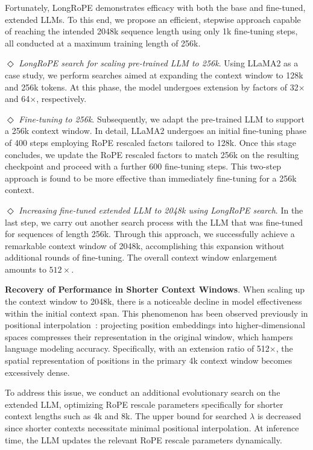 Fortunately, LongRoPE demonstrates efficacy with both the base and fine-tuned, extended LLMs. To this end, we propose an efficient, stepwise approach capable of reaching the intended 2048k sequence length using only 1k fine-tuning steps, all conducted at a maximum training length of 256k.

$\Diamond$ \textit{LongRoPE search for scaling pre-trained LLM to 256k}. Using LLaMA2 as a case study, we perform searches aimed at expanding the context window to 128k and 256k tokens. At this phase, the model undergoes extension by factors of 32$\times$ and 64$\times$, respectively.

$\Diamond$ \textit{Fine-tuning to 256k}. Subsequently, we adapt the pre-trained LLM to support a 256k context window. In detail, LLaMA2 undergoes an initial fine-tuning phase of 400 steps employing RoPE rescaled factors tailored to 128k. Once this stage concludes, we update the RoPE rescaled factors to match 256k on the resulting checkpoint and proceed with a further 600 fine-tuning steps. This two-step approach is found to be more effective than immediately fine-tuning for a 256k context.

$\Diamond$ \textit{Increasing fine-tuned extended LLM to 2048k using LongRoPE search}. In the last step, we carry out another search process with the LLM that was fine-tuned for sequences of length 256k. Through this approach, we successfully achieve a remarkable context window of 2048k, accomplishing this expansion without additional rounds of fine-tuning. The overall context window enlargement amounts to $512\times$.

\textbf{Recovery of Performance in Shorter Context Windows}. When scaling up the context window to 2048k, there is a noticeable decline in model effectiveness within the initial context span. This phenomenon has been observed previously in positional interpolation~\cite{pi}: projecting position embeddings into higher-dimensional spaces compresses their representation in the original window, which hampers language modeling accuracy. Specifically, with an extension ratio of 512$\times$, the spatial representation of positions in the primary 4k context window becomes excessively dense.

To address this issue, we conduct an additional evolutionary search on the extended LLM, optimizing RoPE rescale parameters specifically for shorter context lengths such as 4k and 8k. The upper bound for searched $\lambda$ is decreased since shorter contexts necessitate minimal positional interpolation. At inference time, the LLM updates the relevant RoPE rescale parameters dynamically.

